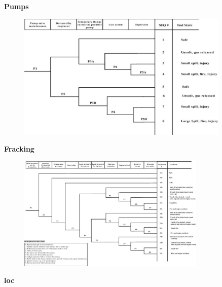 \documentclass[aspectratio=1610,pdftex,dvipsnames,compress,xcolor={dvipsnames}]{beamer}
\newcommand{\acs}{\acrshort} %
\begin{document}
\begin{frame}[plain]{}
    \centering\LARGE\textbf{Pumps}
\end{frame}


\addtocounter{framenumber}{-1}
\begin{frame}{}
    \begin{figure}
        \centering
        \includegraphics[width=0.90\textwidth]{event.tree_pump.valve.jpg}
    \end{figure}
\end{frame}


\begin{frame}[plain]{}
    \centering\LARGE\textbf{Fracking}
\end{frame}


\addtocounter{framenumber}{-1}
\begin{frame}{}
    \begin{figure}
        \centering
        \includegraphics[width=0.80\textwidth]{event.tree_gas.jpg}
    \end{figure}
\end{frame}


\begin{frame}[plain]{}
    \centering\LARGE\textbf{\acs{loc}}
\end{frame}
\end{document}
